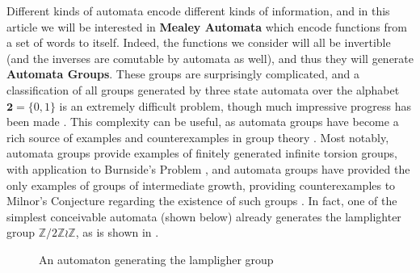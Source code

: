 \documentclass[runningheads]{llncs}
\newcommand{\Z}{\mathbb{Z}}
\newcommand{\2}{\textbf{2}}
\begin{document}
Different kinds of automata encode different kinds of information, and
in this article we will be interested in \textbf{Mealey Automata} which encode
functions from a set of words to itself. Indeed, the functions we consider
will all be invertible (and the inverses are comutable by automata as well),
and thus they will generate \textbf{Automata Groups}.
These groups are surprisingly complicated, and a classification of all groups 
generated by three state automata over the alphabet $\2 = \{0,1\}$ is an 
extremely difficult problem, though much impressive progress has been 
made \cite{Bondarenko09:three_state}. This complexity can be useful, 
as automata groups have become a rich source of examples and counterexamples
in group theory
\cite{Nekrashevych05:self_similar_groups%
     ,Sidki00:one_rooted_trees%
     ,GrigorchukNS00:automata_groups%
     }. 
Most notably, automata groups provide examples of finitely generated 
infinite torsion groups, with application to 
Burnside's Problem \cite{Gupta83:burnside}, and automata groups have
provided the only examples of groups of intermediate growth, providing 
counterexamples to Milnor's Conjecture regarding the existence of such groups
\cite{Grigorchuk11:Milnor}. In fact, one of the simplest conceivable automata 
(shown below) already generates the lamplighter group $\Z/2\Z \wr \Z$, as
is shown in \cite{GrigorchukZuk01:lamplighter}.

\begin{figure}
\begin{center}
\end{center}

\caption{An automaton generating the lampligher group}
\label{fig:1}
\end{figure}
\end{document}
